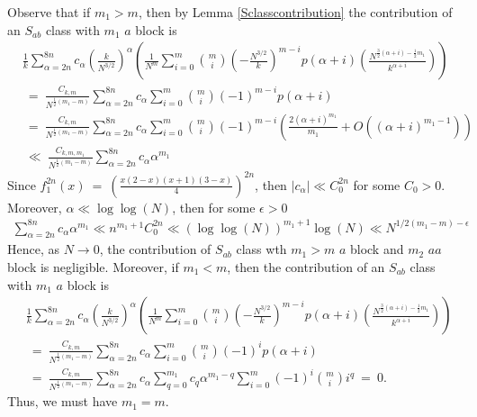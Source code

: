 \documentclass[12pt,reqno]{amsart}
\theoremstyle{plain} %
\theoremstyle{remark}
\theoremstyle{definition}
\renewcommand{\a}{\alpha}
\newcommand{\abs}[1]{\left|#1\right|}
\begin{document}
Observe that if $m_1>m$, then by Lemma \ref{Sclasscontribution} the contribution of an $S_{ab}$ class with $m_1$ $a$ block is
\begin{align*}
&\frac{1}{k}\sum_{\a=2n}^{8n}c_\a\left(\frac{k}{N^{3/2}}\right)^\a\left(\frac{1}{N^m}\sum_{i=0}^m\binom{m}{i}\left(-\frac{N^{3/2}}{k}\right)^{m-i}p(\a+i)\left(\frac{N^{\frac{3}{2}(\a+i)-\frac{1}{2}m_1}}{k^{\a+i}}\right)\right) \\
&\ = \ \frac{C_{k,m}}{N^{\frac{1}{2}(m_1-m)}}\sum_{\a=2n}^{8n}c_\a \sum_{i=0}^m\binom{m}{i}(-1)^{m-i}p(\a+i) \\
&\ = \ \frac{C_{k,m}}{N^{\frac{1}{2}(m_1-m)}}\sum_{\a=2n}^{8n}c_\a \sum_{i=0}^m\binom{m}{i}(-1)^{m-i}\left(\frac{2(\a+i)^{m_1}}{m_1}+O\left((\a+i)^{m_1-1}\right)\right) \\
&\ \ll \ \frac{C_{k,m,m_1}}{N^{\frac{1}{2}(m_1-m)}}\sum_{\a=2n}^{8n}c_\a\a^{m_1}
\end{align*}
Since $f_1^{2n}(x) \ = \ \left(\frac{x(2-x)(x+1)(3-x)}{4}\right)^{2n}$, then $\abs{c_\a}\ll C_0^{2n}$ for some $C_0>0$. Moreover, $\a\ll\log\log(N)$, then for some $\epsilon>0$ 
\begin{align*}
\sum_{\a=2n}^{8n}c_\a \a^{m_1}\ll n^{m_1+1}C_0^{2n}\ll (\log\log(N))^{m_1+1}\log(N)\ll N^{1/2(m_1-m)-\epsilon}
\end{align*}
Hence, as $N\rightarrow 0$, the contribution of $S_{ab}$ class wth $m_1>m$ $a$ block and $m_2$ $aa$ block is negligible. Moreover, if $m_1<m$, then the contribution of an $S_{ab}$ class with $m_1$ $a$ block is
\begin{align*}
&\frac{1}{k}\sum_{\a=2n}^{8n}c_\a\left(\frac{k}{N^{3/2}}\right)^\a\left(\frac{1}{N^m}\sum_{i=0}^m\binom{m}{i}\left(-\frac{N^{3/2}}{k}\right)^{m-i}p(\a+i)\left(\frac{N^{\frac{3}{2}(\a+i)-\frac{1}{2}m_1}}{k^{\a+i}}\right)\right) \\
&\ = \ \frac{C_{k,m}}{N^{\frac{1}{2}(m_1-m)}}\sum_{\a=2n}^{8n}c_\a\sum_{i=0}^m\binom{m}{i}(-1)^ip(\a+i) \\
&\ = \ \frac{C_{k,m}}{N^{\frac{1}{2}(m_1-m)}}\sum_{\a=2n}^{8n}c_\a \sum_{q=0}^{m_1}c_q \a^{m_1-q} \sum_{i=0}^m(-1)^i\binom{m}{i} i^q \ = \ 0.
\end{align*}
Thus, we must have $m_1=m$.
\end{document}
